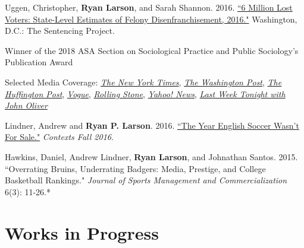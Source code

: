 \documentclass[letterpaper]{article}
\renewenvironment{itemize}{
  \begin{list}{}{
    \setlength{\leftmargin}{1.5em}
  }
}{
  \end{list}
}
\begin{document}
\begin{itemize}
\item Uggen, Christopher, \textbf{Ryan Larson}, and Sarah Shannon. 2016. \href{http://www.sentencingproject.org/wp-content/uploads/2016/10/6-Million-Lost-Voters.pdf}{``6 Million Lost Voters: State-Level Estimates of Felony Disenfranchisement, 2016."} Washington, D.C.: The Sentencing Project.
\begin{itemize}
\item Winner of the 2018 ASA Section on Sociological Practice and Public Sociology's Publication Award
\item Selected Media Coverage: \href{http://www.nytimes.com/interactive/2016/10/06/us/unequal-effect-of-laws-that-block-felons-from-voting.html?_r=0}{\textit{The New York Times}}, \href{https://www.washingtonpost.com/news/powerpost/wp/2016/10/07/6-million-citizens-including-1-in-13-african-americans-are-blocked-from-voting-because-of-felonies/}{\textit{The Washington Post}}, \href{http://www.huffingtonpost.com/harlan-green/trump-the-terrible-demago_b_12392904.html}{\textit{The Huffington Post}}, \href{http://www.vogue.com/13489654/2016-presidential-election-felony-disenfranchisement/}{\textit{Vogue}}, \href{http://www.rollingstone.com/politics/features/six-million-adults-who-wont-influence-this-election-w443693}{\textit{Rolling Stone}}, \href{https://www.yahoo.com/news/more-6-million-americans-t-vote-election-105300558.html}{\textit{Yahoo! News}}, \href{https://www.youtube.com/watch?time_continue=2&v=NpPyLcQ2vdI}{\textit{Last Week Tonight with John Oliver}}
\end{itemize}

\item Lindner, Andrew and \textbf{Ryan P. Larson}. 2016. \href{http://journals.sagepub.com/doi/full/10.1177/1536504216685127}{``The Year English Soccer Wasn't For Sale."} \textit{Contexts Fall 2016}. 

\item Hawkins, Daniel, Andrew Lindner, \textbf{Ryan Larson}, and Johnathan Santos. 2015. ``Overrating Bruins, Underrating Badgers: Media, Prestige, and College Basketball Rankings." \textit{Journal of Sports Management and Commercialization} 6(3): 11-26.*

\end{itemize}

\section*{\textbf{Works in Progress}}
\end{document}
